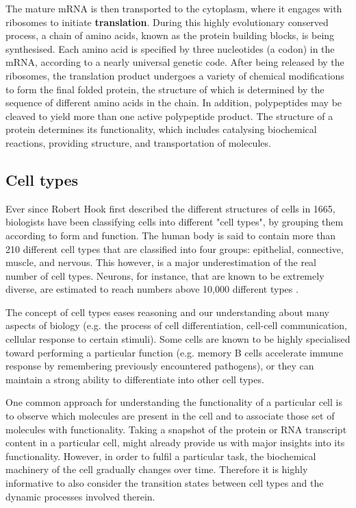 The mature mRNA is then transported to the cytoplasm, where it engages with ribosomes to initiate \textbf{translation}. During this highly evolutionary conserved process, a chain of amino acids, known as the protein building blocks, is being synthesised. Each amino acid is specified by three nucleotides (a codon) in the mRNA, according to a nearly universal genetic code. After being released by the ribosomes, the translation product undergoes a variety of chemical modifications to form the final folded protein, the structure of which is determined by the sequence of different amino acids in the chain. In addition, polypeptides may be cleaved to yield more than one active polypeptide product. The structure of a protein determines its functionality, which includes catalysing biochemical reactions, providing structure, and transportation of molecules.


\subsection{Cell types}
Ever since Robert Hook first described the different structures of cells in 1665, biologists have been classifying cells into different "cell types", by grouping them according to form and function.
The human body is said to contain more than 210 different cell types that are classified into four groups: epithelial, connective, muscle, and nervous. This however, is a major underestimation of the real number of cell types. Neurons, for instance, that are known to be extremely diverse, are estimated to reach numbers above 10,000 different types \cite{strachan_humanmoleculargenetics_2011}.

The concept of cell types eases reasoning and our understanding about many aspects of biology (e.g. the process of cell differentiation, cell-cell communication, cellular response to certain stimuli). Some cells are known to be highly specialised toward performing a particular function (e.g. memory B cells accelerate immune response by remembering previously encountered pathogens), or they can maintain a strong ability to differentiate into other cell types.

One common approach for understanding the functionality of a particular cell is to observe which molecules are present in the cell and to associate those set of molecules with functionality. Taking a snapshot of the protein or RNA transcript content in a particular cell, might already provide us with major insights into its functionality. However, in order to fulfil a particular task, the biochemical machinery of the cell gradually changes over time. Therefore it is highly informative to also consider the transition states between cell types and the dynamic processes involved therein.

